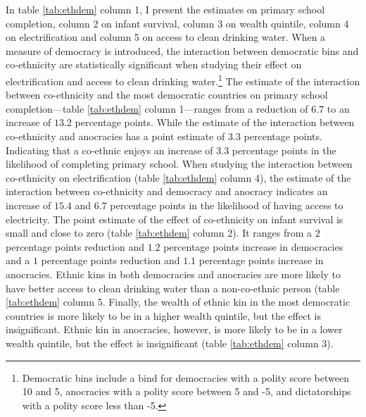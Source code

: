 \documentclass{wptemp}
\begin{document}


In table \ref{tab:ethdem} column 1, I present the estimates on primary school completion, column 2 on infant survival, column 3 on wealth quintile, column 4 on electrification and column 5 on access to clean drinking water. When a measure of democracy is introduced, the interaction between democratic bins and co-ethnicity are statistically significant when studying their effect on electrification and access to clean drinking water.\footnote{Democratic bins include a bind for democracies with a polity score between 10 and 5, anocracies with a polity score between 5 and -5, and dictatorships with a polity score less than -5.} The estimate of the interaction between co-ethnicity and the most democratic countries on primary school completion---table \ref{tab:ethdem} column 1---ranges from a reduction of $6.7$ to an increase of $13.2$ percentage points. While the estimate of the interaction between co-ethnicity and anocracies has a point estimate of $3.3$ percentage points. Indicating that a co-ethnic enjoys an increase of $3.3$ percentage points in the likelihood of completing primary school. When studying the interaction between co-ethnicity on electrification (table \ref{tab:ethdem} column 4), the estimate of the interaction between co-ethnicity and democracy and anocracy indicates an increase of $15.4$ and $6.7$ percentage points in the likelihood of having access to electricity. The point estimate of the effect of co-ethnicity on infant survival is small and close to zero (table \ref{tab:ethdem} column 2). It ranges from a $2$ percentage points reduction and $1.2$ percentage points increase in democracies and a $1$ percentage points reduction and $1.1$ percentage points increase in anocracies. Ethnic kins in both democracies and anocracies are more likely to have better access to clean drinking water than a non-co-ethnic person (table \ref{tab:ethdem} column 5. Finally, the wealth of ethnic kin in the most democratic countries is more likely to be in a higher wealth quintile, but the effect is insignificant. Ethnic kin in anocracies, however, is more likely to be in a lower wealth quintile, but the effect is insignificant (table \ref{tab:ethdem} column 3). 
\end{document}
